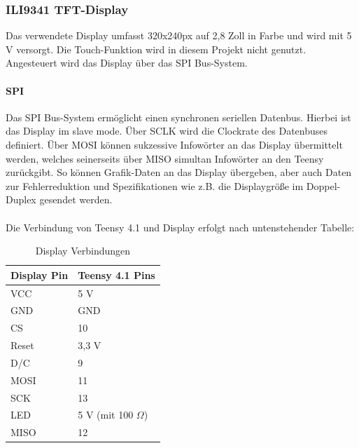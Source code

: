 \documentclass[12pt]{article}
\begin{document}
\subsubsection{ILI9341 TFT-Display}
Das verwendete Display umfasst 320x240px auf 2,8 Zoll in Farbe und wird mit 5 V versorgt.
Die Touch-Funktion wird in diesem Projekt nicht genutzt.
Angesteuert wird das Display über das SPI Bus-System.

\paragraph{SPI}
Das SPI Bus-System ermöglicht einen synchronen seriellen Datenbus. Hierbei ist das Display im \glq slave mode\grq{}\:.
Über SCLK wird die Clockrate des Datenbuses definiert. Über \glq MOSI\grq{}\: können sukzessive Infowörter an das Display übermittelt werden, welches 
seinerseits über \glq MISO\grq{}\: simultan Infowörter an den Teensy zurückgibt. So können Grafik-Daten an das Display übergeben, aber auch Daten zur 
Fehlerreduktion und Spezifikationen wie z.B. die Displaygröße im Doppel-Duplex gesendet werden.
\\
\\
Die Verbindung von Teensy 4.1 und Display erfolgt nach untenstehender Tabelle:
\begin{table}[h]
  \centering
  \caption{Display Verbindungen}
  \label{tbl:displayverbindungen}
  \begin{tabular}{l|l}
    \textbf{Display Pin}  & \textbf{Teensy 4.1 Pins}\\
    \hline
    VCC & 5 V\\
 
    GND	 & GND\\
 
    CS	 & 10\\

    Reset	 & 3,3 V\\

    D/C	 & 9\\

    MOSI	 & 11\\

    SCK	 & 13\\

    LED	 & 5 V (mit 100 $\Omega$)\\

    MISO	 & 12\\
   

  \end{tabular}    

\end{table}
\end{document}
